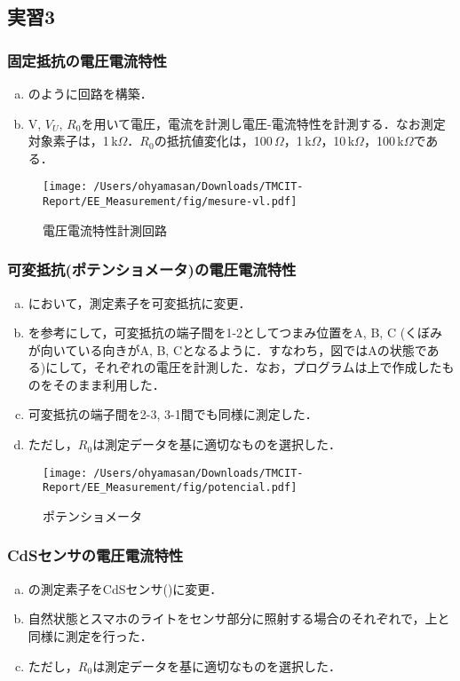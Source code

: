 \subsection{実習3}
\subsubsection{固定抵抗の電圧電流特性}
\begin{enumerate}[a)]
	\item {}のように回路を構築．
	\item V, $V_{U}$, $R_{0}$を用いて電圧，電流を計測し電圧-電流特性を計測する．なお測定対象素子は，1\,k\rm{$\Omega$}．$R_{0}$の抵抗値変化は，100\,\rm{$\Omega$}，1\,k\rm{$\Omega$}，10\,k\rm{$\Omega$}，100\,k\rm{$\Omega$}である．
\end{enumerate}

\begin{figure}[h]
\centering
\texttt{[image: /Users/ohyamasan/Downloads/TMCIT-Report/EE\_Measurement/fig/mesure-vl.pdf]}
\caption{電圧電流特性計測回路}
\label{fig:mesure-vl}
\end{figure}


\subsubsection{可変抵抗(ポテンショメータ)の電圧電流特性}
\begin{enumerate}[a)]
	\item {}において，測定素子を可変抵抗に変更．
	\item {}を参考にして，可変抵抗の端子間を1-2としてつまみ位置をA, B, C (くぼみが向いている向きがA, B, Cとなるように．すなわち，図ではAの状態である)にして，それぞれの電圧を計測した．なお，プログラムは上で作成したものをそのまま利用した．
	\item 可変抵抗の端子間を2-3, 3-1間でも同様に測定した．
	\item ただし，$R_{0}$は測定データを基に適切なものを選択した．
\end{enumerate}

\begin{figure}[h]
\centering
\texttt{[image: /Users/ohyamasan/Downloads/TMCIT-Report/EE\_Measurement/fig/potencial.pdf]}
\caption{ポテンショメータ}
\label{fig:poten}
\end{figure}

\subsubsection{CdSセンサの電圧電流特性}
\begin{enumerate}[a)]
	\item {}の測定素子をCdSセンサ()に変更．
	\item 自然状態とスマホのライトをセンサ部分に照射する場合のそれぞれで，上と同様に測定を行った．
	\item ただし，$R_{0}$は測定データを基に適切なものを選択した．
\end{enumerate}

